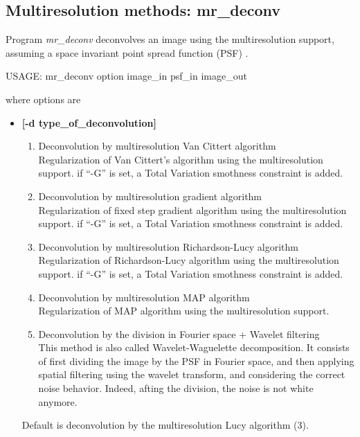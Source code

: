 \begin{itemize}
\subsection{Multiresolution methods: mr\_deconv}
Program 
{\em mr\_deconv} deconvolves an image using the multiresolution
support, assuming a space invariant point spread
function (PSF) \cite{starck:sta94_3,starck:sta94_2,starck:pan96,starck:sta02_2}.
{\bf
\begin{center}
 USAGE: mr\_deconv option image\_in psf\_in image\_out
\end{center}}
where options are 
\begin{itemize}
\baselineskip=0.4truecm
\item {\bf [-d type\_of\_deconvolution]}
\begin{enumerate}
\baselineskip=0.4truecm
\item  Deconvolution by multiresolution Van Cittert algorithm \\
Regularization of Van Cittert's algorithm using the multiresolution support.
if ``-G'' is set, a Total Variation smothness constraint is added. 
\item  Deconvolution by multiresolution gradient algorithm \\
Regularization of fixed step gradient algorithm using the multiresolution support.
if ``-G'' is set, a Total Variation smothness constraint is added. 
\item  Deconvolution by multiresolution Richardson-Lucy algorithm \\
Regularization of Richardson-Lucy algorithm using the multiresolution support.
if ``-G'' is set, a Total Variation smothness constraint is added. 
\item  Deconvolution by multiresolution MAP algorithm \\
Regularization of MAP  algorithm using the multiresolution support.
\item  Deconvolution by the division in Fourier space + Wavelet filtering \\
This method is also called Wavelet-Waguelette decomposition. It consists of
first dividing the image by the PSF in Fourier space, and then
applying spatial filtering using the wavelet transform, and considering
the correct noise behavior. Indeed, afting the division, the noise is not
white anymore.
\end{enumerate}
Default is deconvolution by the multiresolution Lucy algorithm (3).


\end{itemize}
\end{itemize}
